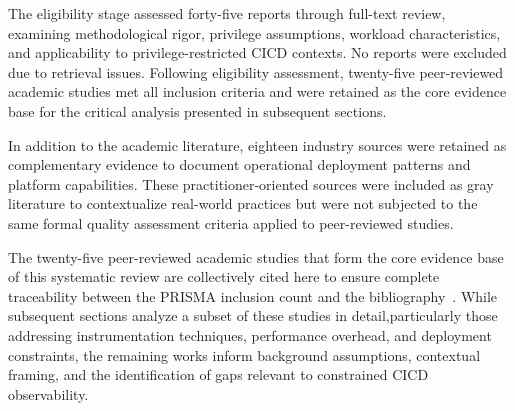 The eligibility stage assessed forty-five reports through full-text review, examining methodological rigor, privilege assumptions, workload characteristics, and applicability to privilege-restricted \ac{CICD} contexts. No reports were excluded due to retrieval issues. Following eligibility assessment, twenty-five peer-reviewed academic studies met all inclusion criteria and were retained as the core evidence base for the critical analysis presented in subsequent sections.

In addition to the academic literature, eighteen industry sources were retained as complementary evidence to document operational deployment patterns and platform capabilities. These practitioner-oriented sources were included as gray literature to contextualize real-world practices but were not subjected to the same formal quality assessment criteria applied to peer-reviewed studies.

The twenty-five peer-reviewed academic studies that form the core evidence base of this systematic review are collectively cited here to ensure complete traceability between the PRISMA inclusion count and the bibliography~\parencite{correiaMonintainerOrchestrationindependentExtensible2023, dingaEmpiricalEvaluationEnergy2023, grossmannMonitoringContainerServices2017, hasanthEvaluatingPerformanceSidecarbased2024, InvestigatingPerformanceOverhead, janecekContainerWorkloadCharacterization2021, kannanDesigningLightweightNetwork2024, karkanPerformanceOverheadOpenTelemetry, levinViperProbeUsingEBPF2020, liuJCallGraphTracingMicroservices2019, norgrenOPTIMIZINGDISTRIBUTEDTRACING, pappula2021building, piProfilingDistributedSystems2018, raithEndtoEndFrameworkBenchmarking2022, ramachandranFUSEFaultDiagnosis2023, sahuSidecarsCentralLane2023, salcedo-navarroK8sidecarModularKubernetes2025, sandbergEvaluatingOpenTelemetrysImpact, sharmaEBPFEnhancedCompleteObservability2024, sharmaIMPROVINGMICROSERVICESOBSERVABILITY2023, soldaniEBPFNewApproach2023, tanResearchLightweightService2023, taylorOpenFormatScalable2020, TraceWeaverDistributedRequest, usmanDESKDistributedObservability2023}. While subsequent sections analyze a subset of these studies in detail,particularly those addressing instrumentation techniques, performance overhead, and deployment constraints, the remaining works inform background assumptions, contextual framing, and the identification of gaps relevant to constrained \ac{CICD} observability.



